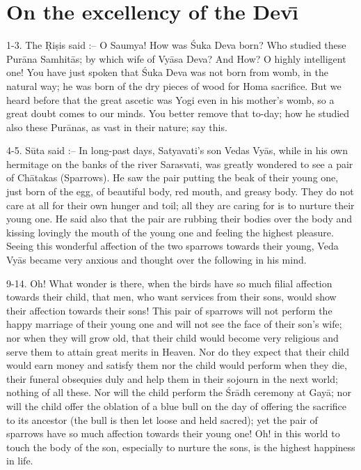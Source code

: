 \chapter{On the excellency of the Dev\={\i}}

1-3. The \d{R}i\d{s}is said :-- O Saumya! How was \'Suka Deva born? Who studied these Pur\=ana Samhit\=as; by which wife of Vy\=asa Deva? And How? O highly intelligent one! You have just spoken that \'Suka Deva was not born from womb, in the natural way; he was born of the dry pieces of wood for Homa sacrifice. But we heard before that the great ascetic was Yogi even in his mother's womb, so a great doubt comes to our minds. You better remove that to-day; how he studied also these Pur\=anas, as vast in their nature; say this.

4-5. S\=uta said :-- In long-past days, Satyavati's son Vedas Vy\=as, while in his own hermitage on the banks of the river Sarasvati, was greatly wondered to see a pair of Ch\=atakas (Sparrows). He saw the pair putting the beak of their young one, just born of the egg, of beautiful body, red mouth, and greasy body. They do not care at all for their own hunger and toil; all they are caring for is to nurture their young one. He said also that the pair are rubbing their bodies over the body and kissing lovingly the mouth of the young one and feeling the highest pleasure. Seeing this wonderful affection of the two sparrows towards their young, Veda Vy\=as became very anxious and thought over the following in his mind.

9-14. Oh! What wonder is there, when the birds have so much filial affection towards their child, that men, who want services from their sons, would show their affection towards their sons! This pair of sparrows will not perform the happy marriage of their young one and will not see the face of their son's wife; nor when they will grow old, that their child would become very religious and serve them to attain great merits in Heaven. Nor do they expect that their child would earn money and satisfy them nor the child would perform when they die, their funeral obsequies duly and help them in their sojourn in the next world; nothing of all these. Nor will the child perform the \'Sr\=adh ceremony at Gay\=a; nor will the child offer the oblation of a blue bull on the day of offering the sacrifice to its ancestor (the bull is then let loose and held sacred); yet the pair of sparrows have so much affection towards their young one! Oh! in this world to touch the body of the son, especially to nurture the sons, is the highest happiness in life.

